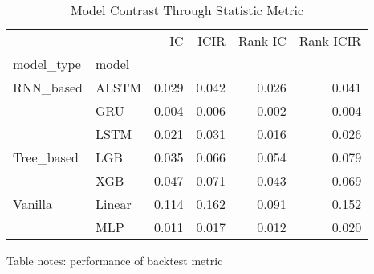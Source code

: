\documentclass[10pt,letterpaper]{article}
\begin{document}
\begin{table}[!ht]
\centering
\caption{Model Contrast Through Statistic Metric}
\label{Model Contrast Through Statistic Metric}
\begin{tabular}{llrrrr}
\toprule
        &     &     IC &   ICIR &  Rank IC &  Rank ICIR \\
model\_type & model &        &        &          &            \\
\midrule
RNN\_based & ALSTM &  0.029 &  0.042 &    0.026 &      0.041 \\
        & GRU &  0.004 &  0.006 &    0.002 &      0.004 \\
        & LSTM &  0.021 &  0.031 &    0.016 &      0.026 \\
Tree\_based & LGB &  0.035 &  0.066 &    0.054 &      0.079 \\
        & XGB &  0.047 &  0.071 &    0.043 &      0.069 \\
Vanilla & Linear &  0.114 &  0.162 &    0.091 &      0.152 \\
        & MLP &  0.011 &  0.017 &    0.012 &      0.020 \\
\bottomrule
\end{tabular}




\begin{flushleft}
Table notes: performance of backtest metric
\end{flushleft}
\label{table1}

\end{table}
\end{document}
